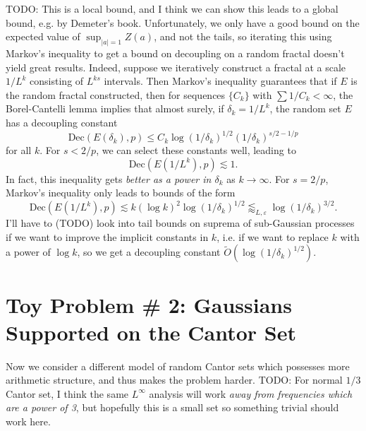 \documentclass[dvipsnames,letterpaper,12pt]{article}
\numberwithin{equation}{section}
\numberwithin{theorem}{section}
\begin{document}
TODO: This is a local bound, and I think we can show this leads to a global bound, e.g. by Demeter's book. Unfortunately, we only have a good bound on the expected value of $\sup_{|a| = 1} Z(a)$, and not the tails, so iterating this using Markov's inequality to get a bound on decoupling on a random fractal doesn't yield great results. Indeed, suppose we iteratively construct a fractal at a scale $1/L^k$ consisting of $L^{ks}$ intervals. Then Markov's inequality guarantees that if $E$ is the random fractal constructed, then for sequences $\{ C_k \}$ with $\sum 1/C_k < \infty$, the Borel-Cantelli lemma implies that almost surely, if $\delta_k = 1/L^k$, the random set $E$ has a decoupling constant
%
\[ \text{Dec}(E(\delta_k),p) \leq C_k \log (1/\delta_k)^{1/2} (1/\delta_k)^{s/2 - 1/p} \]
%
for all $k$. For $s < 2/p$, we can select these constants well, leading to
%
\[ \text{Dec}(E(1/L^k),p) \lesssim 1. \]
%
In fact, this inequality gets \emph{better as a power in $\delta_k$} as $k \to \infty$. For $s = 2/p$, Markov's inequality only leads to bounds of the form
%
\[ \text{Dec}(E(1/L^k),p) \lesssim k (\log k)^2 \log(1/\delta_k)^{1/2} \lessapprox_{L,\varepsilon} \log(1/\delta_k)^{3/2}. \]
%
I'll have to (TODO) look into tail bounds on suprema of sub-Gaussian processes if we want to improve the implicit constants in $k$, i.e. if we want to replace $k$ with a power of $\log k$, so we get a decoupling constant $\widetilde{O}( \log(1/\delta_k)^{1/2})$.

\section{Toy Problem \# 2: Gaussians Supported on the Cantor Set}

Now we consider a different model of random Cantor sets which possesses more arithmetic structure, and thus makes the problem harder. TODO: For normal $1/3$ Cantor set, I think the same $L^\infty$ analysis will work \emph{away from frequencies which are a power of 3}, but hopefully this is a small set so something trivial should work here.
\end{document}
